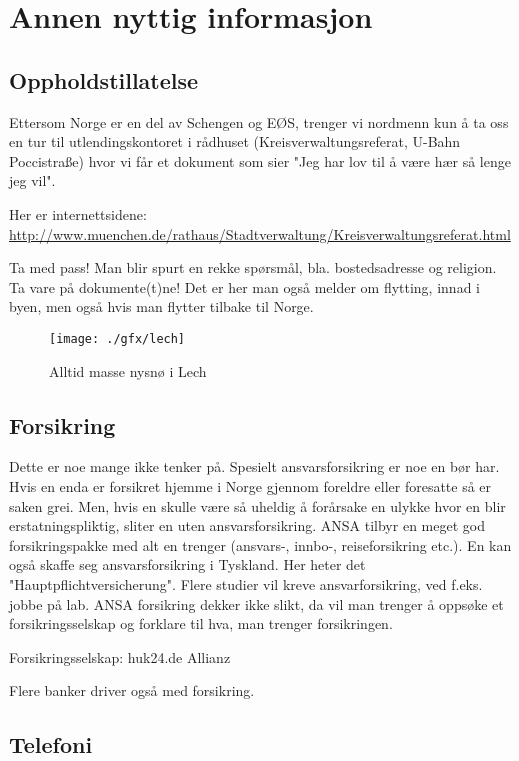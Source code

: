 \chapter{Annen nyttig informasjon}

\section{Oppholdstillatelse}
Ettersom Norge er en del av Schengen og EØS, trenger vi nordmenn kun å ta oss en tur til utlendingskontoret i rådhuset (Kreisverwaltungsreferat, U-Bahn Poccistraße) hvor vi får et dokument som sier "Jeg har lov til å være hær så lenge jeg vil". 

Her er internettsidene:\\
\url{http://www.muenchen.de/rathaus/Stadtverwaltung/Kreisverwaltungsreferat.html}

Ta med pass! Man blir spurt en rekke spørsmål, bla. bostedsadresse og religion.
Ta vare på dokumente(t)ne!
Det er her man også melder om flytting, innad i byen, men også hvis man flytter tilbake til Norge.

\begin{figure}[h]
\center
\texttt{[image: ./gfx/lech]}
\caption{Alltid masse nysnø i Lech}
\end{figure}

\section{Forsikring}
Dette er noe mange ikke tenker på. Spesielt ansvarsforsikring er noe en bør har. Hvis en enda er forsikret hjemme i Norge gjennom foreldre eller foresatte så er saken grei. Men, hvis en skulle være så uheldig å forårsake en ulykke hvor en blir erstatningspliktig, sliter en uten ansvarsforsikring. ANSA tilbyr en meget god forsikringspakke med alt en trenger (ansvars-, innbo-, reiseforsikring etc.). En kan også skaffe seg ansvarsforsikring i Tyskland. Her heter det "Hauptpflichtversicherung". Flere studier vil kreve ansvarforsikring, ved f.eks. jobbe på lab. ANSA forsikring dekker ikke slikt, da vil man trenger å oppsøke et forsikringsselskap og forklare til hva, man trenger forsikringen. 

Forsikringsselskap: 
huk24.de
Allianz


Flere banker driver også med forsikring.


\section{Telefoni}

